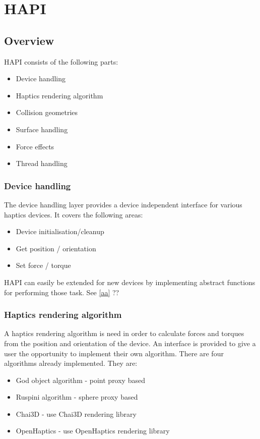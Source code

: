 
\chapter {HAPI}


\section{Overview}

HAPI consists of the following parts:

\begin{itemize}
\item Device handling
\item Haptics rendering algorithm
\item Collision geometries
\item Surface handling
\item Force effects
\item Thread handling
\end{itemize}


\subsection{Device handling}
The device handling layer provides a device independent
interface for various haptics devices. It covers the following
areas:

\begin{itemize}
\item Device initialisation/cleanup
\item Get position / orientation 
\item Set force / torque
\end{itemize}

HAPI can easily be extended for new devices by implementing abstract
functions for performing those task. See \ref{aa} ??

\subsection{Haptics rendering algorithm}
A haptics rendering algorithm is need in order to calculate forces and
torques from the position and orientation of the device. An interface
is provided to give a user the opportunity to implement their own
algorithm. There are four algorithms already implemented. They are:

\begin{itemize}
\item God object algorithm - point proxy based
\item Ruspini algorithm - sphere proxy based
\item Chai3D - use Chai3D rendering library
\item OpenHaptics - use OpenHaptics rendering library
\end{itemize}

